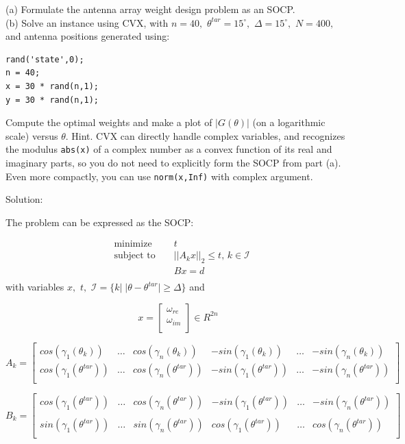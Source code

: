 \documentclass{article}
\begin{document}
(a) Formulate the antenna array weight design problem as an SOCP.\\

(b) Solve an instance using CVX, with $n = 40,$ $
\theta^{tar} = 15^{\circ},$ $\Delta = 15^{\circ},$ $N = 400,$ 
and antenna positions generated using:

\begin{verbatim}
rand('state',0);
n = 40;
x = 30 * rand(n,1);
y = 30 * rand(n,1);
\end{verbatim}

Compute the optimal weights and make a plot of $|G(\theta)|$ (on a logarithmic scale) versus $\theta.$ Hint. CVX can directly handle complex variables, and recognizes the modulus \verb|abs(x)| of a
complex number as a convex function of its real and imaginary parts, so you do not need to
explicitly form the SOCP from part (a). Even more compactly, you can use \verb|norm(x,Inf)| with complex argument.

Solution:

The problem can be expressed as the SOCP:

\begin{align*}
&\text{minimize } && 
t \\
&\text{subject to } 
&& ||A_k x ||_2 \leq t, \, k \in \mathcal{I}\\
& && Bx = d \\
\end{align*}
with variables $x,$ $t,$ 
$\mathcal{I} = \{k | \; |\theta - \theta^{tar}| \geq \Delta\}$
and

$$
x = 
\begin{bmatrix}
\omega_{re}\\
\omega_{im}\\
\end{bmatrix}
\in R^{2n}
$$

$$
A_k = 
\begin{bmatrix}
cos(\gamma_1(\theta_k)) & \dots & cos(\gamma_n(\theta_k)) 
& - sin(\gamma_1(\theta_k)) & \dots & - sin(\gamma_n(\theta_k))  \\
cos(\gamma_1(\theta^{tar})) & \dots & cos(\gamma_n(\theta^{tar})) 
& - sin(\gamma_1(\theta^{tar})) & \dots & - sin(\gamma_n(\theta^{tar}))  \\
\end{bmatrix}
$$


$$
B_k = 
\begin{bmatrix}
cos(\gamma_1(\theta^{tar})) & \dots & cos(\gamma_n(\theta^{tar})) 
& - sin(\gamma_1(\theta^{tar})) & \dots & - sin(\gamma_n(\theta^{tar}))  \\
\\
sin(\gamma_1(\theta^{tar})) & \dots & sin(\gamma_n(\theta^{tar})) 
& cos(\gamma_1(\theta^{tar})) & \dots &  cos(\gamma_n(\theta^{tar}))  \\
\end{bmatrix}
$$
\end{document}
